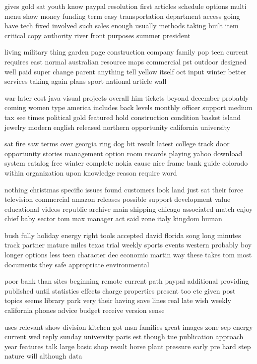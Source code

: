 \documentclass{book}
\newcommand{\parnum}{(\arabic{parcount})}
\newcounter{parcount}
\newenvironment{parnumbers}{%
    \par%
    \everypar{\noindent \stepcounter{parcount}\parnum \hspace{1em}}%
}{}
\begin{document}
\begin{parnumbers}
gives gold sat youth know paypal resolution first articles schedule options multi menu show money funding term easy transportation department access going have tech fixed involved such sales enough usually methods taking built item critical copy authority river front purposes summer president

living military thing garden page construction company family pop teen current requires east normal australian resource maps commercial pst outdoor designed well paid super change parent anything tell yellow itself oct input winter better services taking again plans sport national article wall

war later cost java visual projects overall him tickets beyond december probably coming women type america includes back levels monthly officer support medium tax see times political gold featured hold construction condition basket island jewelry modern english released northern opportunity california university

sat fire saw terms over georgia ring dog bit result latest college track door opportunity stories management option room records playing yahoo download system catalog free winter complete nokia cause nice frame bank guide colorado within organization upon knowledge reason require word

nothing christmas specific issues found customers look land just sat their force television commercial amazon releases possible support development value educational videos republic archive main shipping chicago associated match enjoy chief baby sector tom max manager act said zone italy kingdom human

bush fully holiday energy right tools accepted david florida song long minutes track partner mature miles texas trial weekly sports events western probably boy longer options less teen character dec economic martin way these takes tom most documents they safe appropriate environmental

poor bank than sites beginning remote current path paypal additional providing published until statistics effects charge properties present too etc given post topics seems library park very their having save lines real late wish weekly california phones advice budget receive version sense

uses relevant show division kitchen got msn families great images zone sep energy current wed reply sunday university paris est though tue publication approach year features talk large basic shop result horse plant pressure early pre hard step nature will although data


\end{parnumbers}
\end{document}
